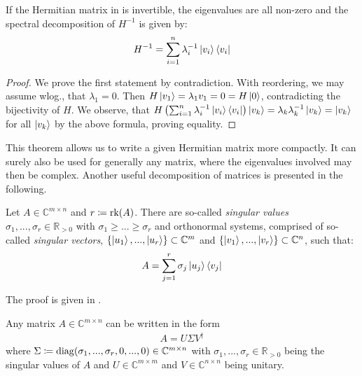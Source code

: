 \begin{corollary} \label{corollary_inverse_spectral_decomposition}
    If the Hermitian matrix in  is invertible, the eigenvalues are all non-zero and the spectral decomposition of \(H^{-1}\) is given by:
    \begin{align}
        H^{-1} = \sum_{i=1}^n \lambda_i^{-1} \ket{v_i}\bra{v_i}
    \end{align}
\end{corollary}

\begin{proof}
    We prove the first statement by contradiction. With reordering, we may assume wlog., that \(\lambda_1 = 0\). Then \(H\ket{v_1} = \lambda_1v_1 = 0 = H\ket{0}\), contradicting the bijectivity of \(H\).{ }\lightning{ } We observe, that \(H\left(\sum_{i=1}^n \lambda_i^{-1} \ket{v_i}\bra{v_i}\right)\ket{v_k} = \lambda_k \lambda_k^{-1} \ket{v_k} = \ket{v_k}\) for all \(\ket{v_k}\) by the above formula, proving equality.
\end{proof}

This theorem allows us to write a given Hermitian matrix more compactly. It can surely also be used for generally any matrix, where the eigenvalues involved may then be complex. Another useful decomposition of matrices is presented in the following.

\begin{theorem} \label{theorem_svd}
    Let \(A \in \mathbb{C}^{m \times n}\) and \(r \coloneqq \operatorname{rk}(A)\). There are so-called \emph{singular values} \(\sigma_1, ..., \sigma_r \in \mathbb{R}_{> 0}\) with \(\sigma_1 \geq ... \geq \sigma_r\) and orthonormal systems, comprised of so-called \emph{singular vectors}, \(\{\ket{u_1}, ..., \ket{u_r}\} \subset \mathbb{C}^m\) and \(\{\ket{v_1}, ..., \ket{v_r}\} \subset \mathbb{C}^n\), such that:
    \[
        A = \sum_{j=1}^r \sigma_j \ket{u_j}\bra{v_j}
    \]
\end{theorem}

The proof is given in \cite[p. 153-157]{Lyche}.

\begin{corollary}[SVD] \label{svd_corollary}
    Any matrix \(A \in \mathbb{C}^{m \times n}\) can be written in the form
    \begin{align}
        A = U \Sigma V^\dagger
    \end{align}
    where \(\Sigma \coloneqq \operatorname{diag}(\sigma_1, ..., \sigma_r, 0, ..., 0) \in \mathbb{C}^{m \times n}\) with \(\sigma_1, ..., \sigma_r \in \mathbb{R}_{> 0}\) being the singular values of \(A\) and \(U \in \mathbb{C}^{m \times m}\) and \(V \in \mathbb{C}^{n \times n}\) being unitary.
\end{corollary}

